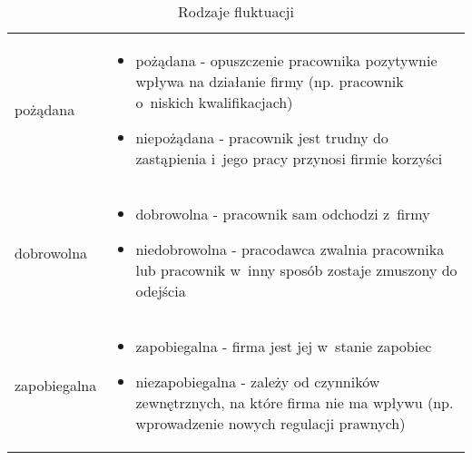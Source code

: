 \noindent\begin{minipage}{\textwidth}
             \begin{table}[H]
                 \raggedright\caption{Rodzaje fluktuacji\label{tabela:fluktuacja-rodzaje}}
                 \begin{center}
                     \begin{tabular}{|P{.15\textwidth}|P{.75\textwidth}|}

                         \hline
                          &
                          \\
                         \hline

                         pożądana &
                         \begin{itemize}
                             \item pożądana - opuszczenie pracownika pozytywnie wpływa na działanie firmy (np. pracownik o~niskich kwalifikacjach)
                             \item niepożądana - pracownik jest trudny do zastąpienia i~jego pracy przynosi firmie korzyści
                         \end{itemize} \\
                         \hline

                         dobrowolna &
                         \begin{itemize}
                             \item dobrowolna - pracownik sam odchodzi z~firmy
                             \item niedobrowolna - pracodawca zwalnia pracownika lub pracownik w~inny sposób zostaje zmuszony do odejścia
                         \end{itemize} \\
                         \hline

                         zapobiegalna &
                         \begin{itemize}
                             \item zapobiegalna - firma jest jej w~stanie zapobiec
                             \item niezapobiegalna - zależy od czynników zewnętrznych, na które firma nie ma wpływu (np. wprowadzenie nowych regulacji prawnych)
                         \end{itemize} \\
                         \hline


\end{tabular}
\end{center}
\end{table}
\end{minipage}

